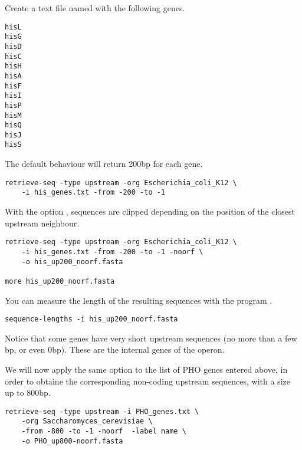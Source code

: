 Create a text file named  with the following
genes.

{\color{Blue} \begin{footnotesize}
\begin{verbatim}
hisL
hisG
hisD
hisC
hisH
hisA
hisF
hisI
hisP
hisM
hisQ
hisJ
hisS
\end{verbatim} \end{footnotesize}
}

The default behaviour will return 200bp for each gene. 

{\color{Blue} \begin{footnotesize}
\begin{verbatim}
retrieve-seq -type upstream -org Escherichia_coli_K12 \
    -i his_genes.txt -from -200 -to -1
\end{verbatim} \end{footnotesize}
}

With the option , sequences are clipped depending on
the position of the closest upstream neighbour.

{\color{Blue} \begin{footnotesize}
\begin{verbatim}
retrieve-seq -type upstream -org Escherichia_coli_K12 \
    -i his_genes.txt -from -200 -to -1 -noorf \
    -o his_up200_noorf.fasta

more his_up200_noorf.fasta
\end{verbatim} \end{footnotesize}
}

You can measure the length of the resulting sequences with the program
.

{\color{Blue} \begin{footnotesize}
\begin{verbatim}
sequence-lengths -i his_up200_noorf.fasta
\end{verbatim} \end{footnotesize}
}

Notice that some genes have very short upstream sequences (no more
than a few bp, or even 0bp). These are the internal genes of the
 operon. 


We will now apply the same option to the list of PHO genes entered
above, in order to obtaine the corresponding non-coding upstream
sequences, with a size up to 800bp.

{\color{Blue} \begin{footnotesize}
\begin{verbatim}
retrieve-seq -type upstream -i PHO_genes.txt \
    -org Saccharomyces_cerevisiae \
    -from -800 -to -1 -noorf  -label name \
    -o PHO_up800-noorf.fasta
\end{verbatim} \end{footnotesize}
} 

